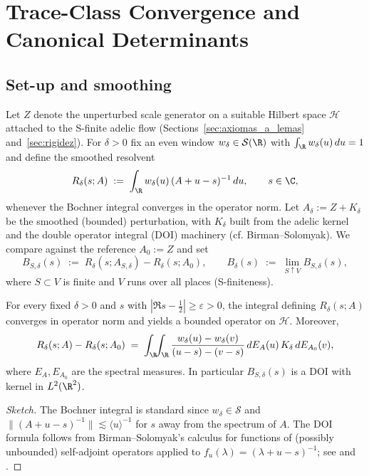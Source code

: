 \section{Trace-Class Convergence and Canonical Determinants}
\label{sec:appendix-traces}

\subsection*{Set-up and smoothing}

Let $Z$ denote the unperturbed scale generator on a suitable Hilbert space
$\mathcal H$ attached to the S-finite adelic flow (Sections~\ref{sec:axiomas_a_lemas}
and~\ref{sec:rigidez}). For $\delta>0$ fix an even window $w_\delta\in\mathcal S(\R)$
with $\int_\R w_\delta(u)\,du=1$ and define the smoothed resolvent
\[
R_\delta(s;A)\;:=\;\int_\R w_\delta(u)\,(A+u - s)^{-1}\,du,
\qquad s\in\C,
\]
whenever the Bochner integral converges in the operator norm.
Let $A_\delta:=Z+K_\delta$ be the smoothed (bounded) perturbation,
with $K_\delta$ built from the adelic kernel and the double operator integral (DOI)
machinery (cf. Birman–Solomyak). We compare against the reference $A_0:=Z$ and set
\[
B_{S,\delta}(s)\;:=\;R_\delta(s;A_{S,\delta})-R_\delta(s;A_0),
\qquad
B_\delta(s)\;:=\;\lim_{S\uparrow V} B_{S,\delta}(s),
\]
where $S\subset V$ is finite and $V$ runs over all places (S-finiteness).

\begin{lemma}
\label{lem:bounded-doi}
For every fixed $\delta>0$ and $s$ with $|\Re s-\tfrac12|\ge \varepsilon>0$,
the integral defining $R_\delta(s;A)$ converges in operator norm and yields a bounded
operator on $\mathcal H$. Moreover,
\[
R_\delta(s;A)-R_\delta(s;A_0)
\;=\;\int_{\R} \!\!\int_{\R}
\frac{w_\delta(u)-w_\delta(v)}{(u-s)-(v-s)}\,dE_A(u)\,K_\delta\,dE_{A_0}(v),
\]
where $E_A,E_{A_0}$ are the spectral measures. In particular $B_{S,\delta}(s)$ is a DOI
with kernel in $L^2(\R^2)$.
\end{lemma}

\begin{proof}[Sketch]
The Bochner integral is standard since $w_\delta\in\mathcal S$ and
$\|(A+u-s)^{-1}\|\lesssim \langle u\rangle^{-1}$ for $s$ away from the spectrum of $A$.
The DOI formula follows from Birman–Solomyak's calculus for functions of (possibly
unbounded) self-adjoint operators applied to $f_u(\lambda)=(\lambda+u-s)^{-1}$; see
\cite{birman2003} and \cite[Ch.~9]{simon2005}.
\end{proof}

